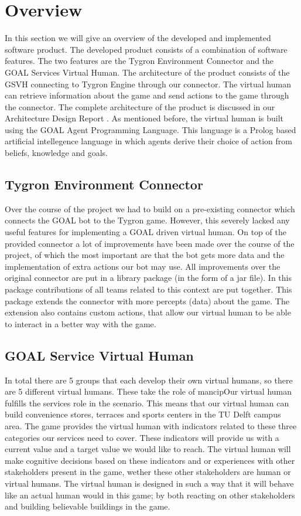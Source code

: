 \section{Overview}
In this section we will give an overview of the developed and implemented software product. The developed product consists of a combination of software features. The two features are the Tygron Environment Connector  and the GOAL Services Virtual Human. The architecture of the product consists of the GSVH connecting to Tygron Engine through our connector. The virtual human can retrieve information about the game and send actions to the game through the connector. The complete architecture of the product is discussed in our Architecture Design Report \cite{CTD16}. As mentioned before, the virtual human is built using the GOAL Agent Programming Language\cite{GOAL16}. This language is a Prolog based artificial intellegence language in which agents derive their choice of action from beliefs, knowledge and goals.

\subsection{Tygron Environment Connector}
Over the course of the project we had to build on a pre-existing connector which connects the GOAL bot to the Tygron game. However, this severely lacked any useful features for implementing a GOAL driven virtual human. On top of the provided connector a lot of improvements have been made over the course of the project, of which the most important are that the bot gets more data and the implementation of extra actions our bot may use. All improvements over the original connector are put in a library package (in the form of a jar file). In this package contributions of all teams related to this context are put together. This package extends the connector with more percepts (data) about the game. The extension also contains custom actions, that allow our virtual human to be able to interact in a better way with the game. 

\subsection{GOAL Service Virtual Human}
In total there are 5 groups that each develop their own virtual humans, so there are 5 different virtual humans. These take the role of mancipOur virtual human fulfills the services role in the scenario. This means that our virtual human can build convenience stores, terraces and sports centers in the TU Delft campus area. The game provides the virtual human with indicators related to these three categories our services need to cover. These indicators will provide us with a current value and a target value we would like to reach. The virtual human will make cognitive decisions based on these indicators and or experiences with other stakeholders present in the game, wether these other stakeholders are human or virtual humans. The virtual human is designed in such a way that it will behave like an actual human would in this game; by both reacting on other stakeholders and building believable buildings in the game.

\newpage